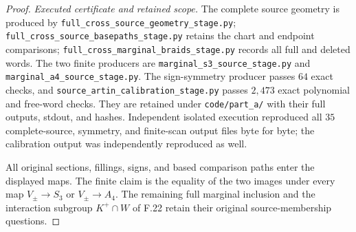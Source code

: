 \begin{proof}
\emph{Executed certificate and retained scope.}
The complete source geometry is produced by
\texttt{full\_cross\_source\_geometry\_stage.py};
\texttt{full\_cross\_source\_basepaths\_stage.py}
retains the chart and endpoint comparisons;
\texttt{full\_cross\_marginal\_braids\_stage.py}
records all full and deleted words.
The two finite producers are
\texttt{marginal\_s3\_source\_stage.py} and
\texttt{marginal\_a4\_source\_stage.py}.
The sign-symmetry producer passes $64$ exact checks,
and \texttt{source\_artin\_calibration\_stage.py}
passes $2,473$ exact polynomial and free-word checks.
They are retained under \texttt{code/part\_a/} with their
full outputs, stdout, and hashes. Independent isolated
execution reproduced all $35$ complete-source, symmetry,
and finite-scan output files byte for byte; the calibration
output was independently reproduced as well.

All original sections, fillings, signs, and based
comparison paths enter the displayed maps. The finite
claim is the equality of the two images under every map
$V_\pm\to S_3$ or $V_\pm\to A_4$. The remaining full
marginal inclusion and the interaction subgroup
$K^+\cap W$ of F.22 retain their original source-membership
questions.
\end{proof}
